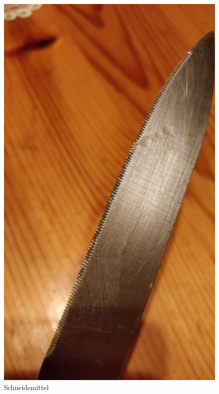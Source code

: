 \begin{figure}[H]
   \begin{minipage}[hbt]{.3\linewidth} %
      \includegraphics[width=\linewidth]{Bilder/Schneideversuch_2.Art/Schneidemittel}
      \caption{Schneidemittel}
      \label{Schneidemittel} 
   \end{minipage}
   \hspace{.4\linewidth}%
   \begin{minipage}[hbt]{.3\linewidth} %

\end{minipage}
\end{figure}
